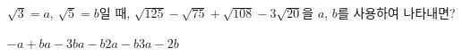 $\sqrt{3}=a$, $\sqrt{5}=b$일 때, $\sqrt{125}-\sqrt{75}+\sqrt{108}-3\sqrt{20}$을 $a$, $b$를 사용하여 나타내면?
\begin{choices32}{$-a+b$}{$a-3b$}{$a-b$}{$2a-b$}{$3a-2b$}\end{choices32}
